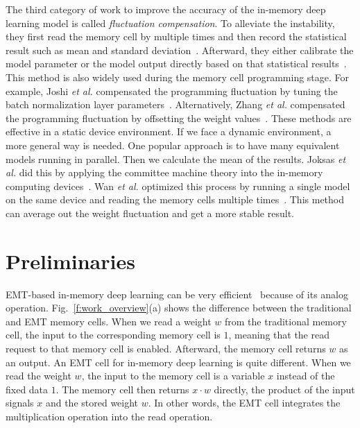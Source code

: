 \documentclass[10pt,journal,compsoc]{IEEEtran}
\begin{document}
The third category of work to improve the accuracy of the in-memory deep learning model is called \textit{fluctuation compensation}. To alleviate the instability, they first read the memory cell by multiple times and then record the statistical result such as mean and standard deviation~\cite{puglisi2015statistical}. Afterward, they either calibrate the model parameter or the model output directly based on that statistical results~\cite {shim2020two}. This method is also widely used during the memory cell programming stage. For example, Joshi \textit{et al.} compensated the programming fluctuation by tuning the batch normalization layer parameters~\cite{joshi2020accurate}.
Alternatively, Zhang \textit{et al.} compensated the programming fluctuation by offsetting the weight values~\cite{zhang2020reliable}. These methods are effective in a static device environment. If we face a dynamic environment, a more general way is needed. One popular approach is to have many equivalent models running in parallel. Then we calculate the mean of the results. Joksas \textit{et al.} did this by applying the committee machine theory into the in-memory computing devices~\cite{joksas2020committee}. Wan \textit{et al.} optimized this process by running a single model on the same device and reading the memory cells multiple times~\cite{wan2020voltage}. This method can average out the weight fluctuation and get a more stable result.

\section{Preliminaries}
\label{s3}

EMT-based in-memory deep learning can be very efficient~\cite{yao2020fully} because of its analog operation. Fig.~\ref{f:work_overview}(a) shows the difference between the traditional and EMT memory cells. When we read a weight $w$ from the traditional memory cell, the input to the corresponding memory cell is $1$, meaning that the read request to that memory cell is enabled. Afterward, the memory cell returns $w$ as an output. An EMT cell for in-memory deep learning is quite different. When we read the weight $w$, the input to the memory cell is a variable $x$ instead of the fixed data $1$. The memory cell then returns $x\cdot w$ directly, the product of the input signals $x$ and the stored weight $w$. In other words, the EMT cell integrates the multiplication operation into the read operation.
\end{document}
